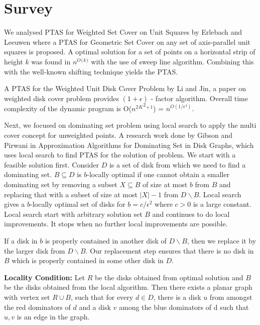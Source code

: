 \documentclass[a4paper,10pt]{article}  %
\renewcommand{\baselinestretch}{1.15}
\begin{document}
	
	\setlength{\parskip}{5.2mm}
	\setlength{\parindent}{0pt}
	\setlength{\textheight}{9.3in}
	\setlength{\textwidth}{6.3in}
	\renewcommand{\baselinestretch}{1.15}
	\setlength{\oddsidemargin}{-0.1in}
	\setlength{\topmargin}{-0.1in}
	
	
	\section{Survey}
	We analysed  PTAS for Weighted Set Cover on Unit Squares by Erlebach and Leeuwen \cite{ErlebachL10} where a PTAS for Geometric Set Cover on any set of axis-parallel unit squares is proposed. A optimal solution for a set of points on a horizontal strip of height $k$ was found in $n^O$$^($$^k$$^)$ with the use of sweep line algorithm. Combining this with the well-known shifting technique yields the PTAS.
	
	\par A PTAS for the Weighted Unit Disk Cover Problem by  Li and Jin\cite{LiJ15}, a paper on weighted disk cover problem provides $(1+\epsilon)$ - factor algorithm. Overall time complexity of the dynamic program is O($n^2$${^K}^{2}$$^+$$^1$) = $n^{O(1/\epsilon^{4})}$.
	
	\par Next, we focused on dominating set problem using local search to apply the multi cover concept for unweighted points. A research work done by Gibson and Pirwani in Approximation Algorithms for Dominating Set in Disk Graphs\cite{matt3320}, which uses local search to find PTAS for the solution of problem. We start with a feasible solution first. Consider $D$ is a set of disk from which we need to find a dominating set. $B \subseteq D$ is $b$-locally optimal if one cannot obtain a smaller dominating set by removing a subset $X \subseteq B$ of size at most $b$ from $B$ and replacing that with a subset of size at most $|X|-1$ from $D\backslash B$. Local search gives a $b$-locally optimal set of disks for $b = c/\epsilon^2$ where $c > 0$ is a large constant. Local search start with arbitrary solution set $B$ and continues to do local improvements. It stops when no further local improvements are possible. 
	
	If a disk in $b$ is properly contained in another disk of $D \backslash B$, then we replace it by the larger disk from $D\backslash B$. Our replacement step ensures that there is no disk in $B$ which is properly contained in some other disk in $D$.
	
	\textbf{Locality Condition:} Let $R$ be the disks obtained from optimal solution and $B$ be the disks obtained from the local algorithm. Then there exists a planar graph with vertex set $R \cup B$, such that for every $d \in D$, there is a disk $u$ from amongst the red dominators of $d$ and a disk $v$ among the blue dominators of d such that ${u, v}$ is an edge in the graph. \cite{matt3320}
	
\end{document}
